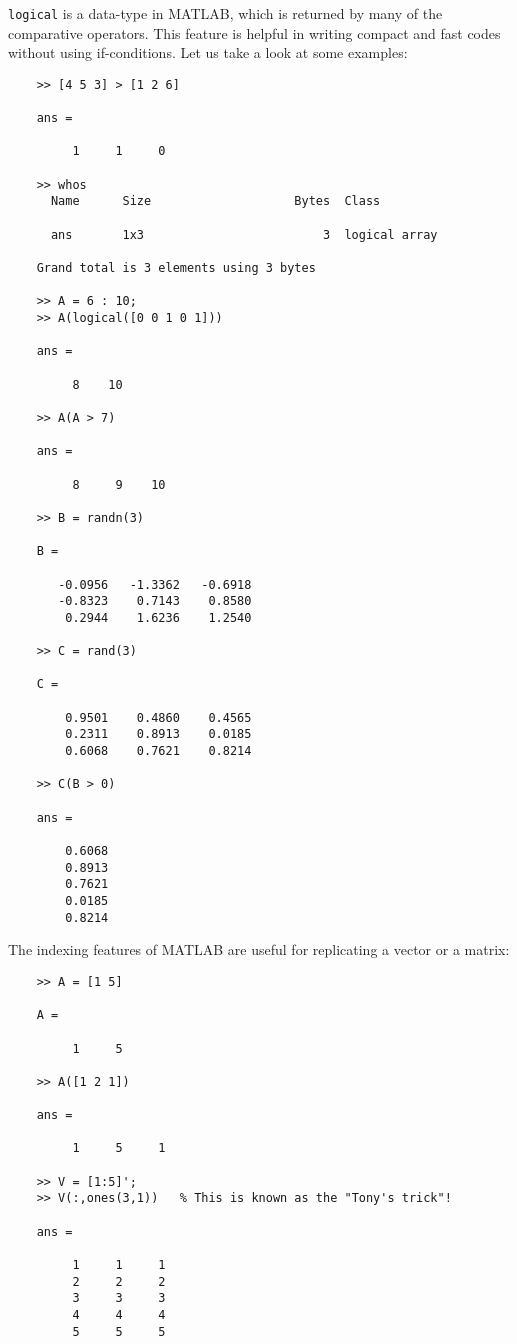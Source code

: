 \documentclass[10pt,a4paper]{article}
\newcounter{example}[section]
\begin{document}
\begin{enumerate}
\texttt{logical} is a data-type in MATLAB, which is returned by many of the comparative operators. This feature is helpful in writing compact and fast codes without using if-conditions. Let us take a look at some examples:
\begin{lstlisting}
	>> [4 5 3] > [1 2 6]
	
	ans =
	
	     1     1     0

	>> whos
	  Name      Size                    Bytes  Class
	
	  ans       1x3                         3  logical array
	
	Grand total is 3 elements using 3 bytes

	>> A = 6 : 10;
	>> A(logical([0 0 1 0 1]))
	
	ans =
	
	     8    10
	
	>> A(A > 7)
	
	ans =
	
	     8     9    10
	
	>> B = randn(3)
	
	B =
	
	   -0.0956   -1.3362   -0.6918
	   -0.8323    0.7143    0.8580
	    0.2944    1.6236    1.2540
	    
	>> C = rand(3)
	
	C =
	
	    0.9501    0.4860    0.4565
	    0.2311    0.8913    0.0185
	    0.6068    0.7621    0.8214
	
	>> C(B > 0)
	
	ans =
	
	    0.6068
	    0.8913
	    0.7621
	    0.0185
	    0.8214
\end{lstlisting}
\end{enumerate}
The indexing features of MATLAB are useful for replicating a vector or a matrix:
\begin{lstlisting}
	>> A = [1 5]
	
	A =
	
	     1     5
	
	>> A([1 2 1])
	
	ans =
	
	     1     5     1
	     
	>> V = [1:5]';
	>> V(:,ones(3,1))	% This is known as the "Tony's trick"!
	
	ans =
	
	     1     1     1
	     2     2     2
	     3     3     3
	     4     4     4
	     5     5     5
\end{lstlisting}
\end{document}
